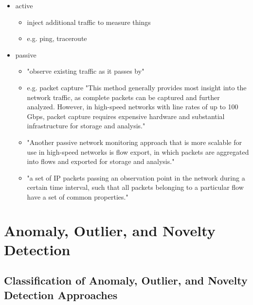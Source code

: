 	\begin{itemize}
		\item active
			\begin{itemize}
				\item inject additional traffic to measure things \parencite{Hofstede2014}
				\item e.g. ping, traceroute
			\end{itemize}
		\item passive
			\begin{itemize}
				\item "observe existing traffic as it passes by" \parencite{Hofstede2014}
				\item e.g. packet capture "This method generally provides most insight into the network traffic, as complete packets can be captured and further analyzed. However, in high-speed networks with line rates of up to 100 Gbps, packet capture requires expensive hardware and substantial infrastructure for storage and analysis." \parencite{Hofstede2014}
				\item "Another passive network monitoring approach that is more scalable for use in high-speed networks is flow export, in which packets are aggregated into flows and exported for storage and analysis." \parencite{Hofstede2014}
				\item  "a set of IP packets passing an observation point in the network during a certain time interval, such that all packets belonging to a particular flow have a set of common properties." \parencite{Claise2013}
				
			\end{itemize}
	\end{itemize}

\section{Anomaly, Outlier, and Novelty Detection}
\label{sec:background:network:novelty}

	\subsection{Classification of Anomaly, Outlier, and Novelty Detection Approaches}
	\label{sec:background:network:novelty:class}
	
